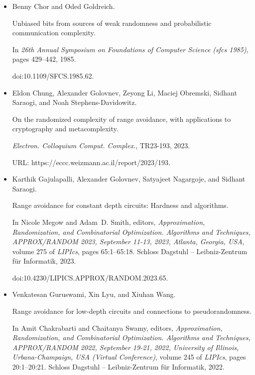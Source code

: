 \documentclass[10pt,a4paper]{article}
\begin{document}
\begin{itemize}
doi:10.1145/3618260.3649602.





\item[] 
[9]

Benny Chor and Oded Goldreich.


Unbiased bits from sources of weak randomness and probabilistic
communication complexity.


In \emph{26th Annual Symposium on Foundations of Computer Science
(sfcs 1985)}, pages 429–442, 1985.


doi:10.1109/SFCS.1985.62.





\item[] 
[10]

Eldon Chung, Alexander Golovnev, Zeyong Li, Maciej Obremski, Sidhant Saraogi,
and Noah Stephens-Davidowitz.


On the randomized complexity of range avoidance, with applications to
cryptography and metacomplexity.


\emph{Electron. Colloquium Comput. Complex.}, TR23-193, 2023.


URL: https://eccc.weizmann.ac.il/report/2023/193.





\item[] 
[11]

Karthik Gajulapalli, Alexander Golovnev, Satyajeet Nagargoje, and Sidhant
Saraogi.


Range avoidance for constant depth circuits: Hardness and algorithms.


In Nicole Megow and Adam D. Smith, editors, \emph{Approximation,
Randomization, and Combinatorial Optimization. Algorithms and Techniques,
APPROX/RANDOM 2023, September 11-13, 2023, Atlanta, Georgia, USA}, volume
275 of \emph{LIPIcs}, pages 65:1–65:18. Schloss Dagstuhl – Leibniz-Zentrum
für Informatik, 2023.


doi:10.4230/LIPICS.APPROX/RANDOM.2023.65.





\item[] 
[12]

Venkatesan Guruswami, Xin Lyu, and Xiuhan Wang.


Range avoidance for low-depth circuits and connections to
pseudorandomness.


In Amit Chakrabarti and Chaitanya Swamy, editors, \emph{Approximation,
Randomization, and Combinatorial Optimization. Algorithms and Techniques,
APPROX/RANDOM 2022, September 19-21, 2022, University of Illinois,
Urbana-Champaign, USA (Virtual Conference)}, volume 245 of \emph{LIPIcs},
pages 20:1–20:21. Schloss Dagstuhl – Leibniz-Zentrum für Informatik,
2022.



\end{itemize}
\end{document}
